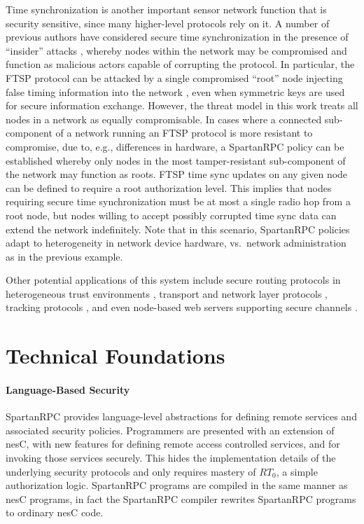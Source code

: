 Time synchronization is another important sensor network function that is security sensitive,
since many higher-level protocols rely on it. A number of previous authors have considered
secure time synchronization in the presence of ``insider'' attacks
\cite{Manzo:2005:TSA:1102219.1102238,Ganeriwal:2008:STS:1380564.1380571}, whereby nodes within
the network may be compromised and function as malicious actors capable of corrupting the
protocol. In particular, the FTSP protocol can be attacked by a single compromised ``root'' node
injecting false timing information into the network \cite{Manzo:2005:TSA:1102219.1102238}, even
when symmetric keys are used for secure information exchange. However, the threat model in this
work treats all nodes in a network as equally compromisable. In cases where a connected
sub-component of a network running an FTSP protocol is more resistant to compromise, due to,
e.g., differences in hardware, a SpartanRPC policy can be established whereby only nodes in the
most tamper-resistant sub-component of the network may function as roots. FTSP time sync updates
on any given node can be defined to require a root authorization level. This implies that nodes
requiring secure time synchronization must be at most a single radio hop from a root node, but
nodes willing to accept possibly corrupted time sync data can extend the network indefinitely.
Note that in this scenario, SpartanRPC policies adapt to heterogeneity in network device
hardware, vs.~network administration as in the previous example.

Other potential applications of this system include secure routing protocols in heterogeneous
trust environments \cite{senroute-ahnj03}, transport and network layer protocols
\cite{perillo-heinzelman-2005}, tracking protocols \cite{brooks-ramanathan-sayeed-2003}, and
even node-based web servers supporting secure channels \cite{1049776}.

\section{Technical Foundations}

\paragraph{Language-Based Security} SpartanRPC provides language-level abstractions for defining
remote services and associated security policies. Programmers are presented with an extension of
nesC, with new features for defining remote access controlled services, and for invoking those
services securely. This hides the implementation details of the underlying security protocols
and only requires mastery of $RT_0$, a simple authorization logic. SpartanRPC programs are
compiled in the same manner as nesC programs, in fact the SpartanRPC compiler rewrites
SpartanRPC programs to ordinary nesC code.

